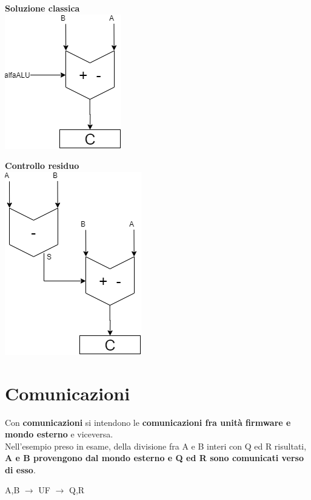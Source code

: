 \documentclass[10pt]{report}
\begin{document}
\begin{list}{}{}
	\begin{multicols}{2}
	\begin{center}
	\textbf{Soluzione classica}\\
	\includegraphics[scale=0.5]{contrres_es3.png}
	\end{center}
	\columnbreak
	\begin{center}
	\textbf{Controllo residuo}\\
	\includegraphics[scale=0.5]{contrres_es3b.png}
	\end{center}
	\end{multicols}
\end{list}
\section{Comunicazioni}
Con \textbf{comunicazioni} si intendono le \textbf{comunicazioni fra unità firmware e mondo esterno} e viceversa.\\
Nell'esempio preso in esame, della divisione fra A e B interi con Q ed R risultati, \textbf{A e B provengono dal mondo esterno e Q ed R sono comunicati verso di esso}.
\begin{center}
A,B $\longrightarrow$ UF $\longrightarrow$ Q,R
\end{center}
\end{document}
